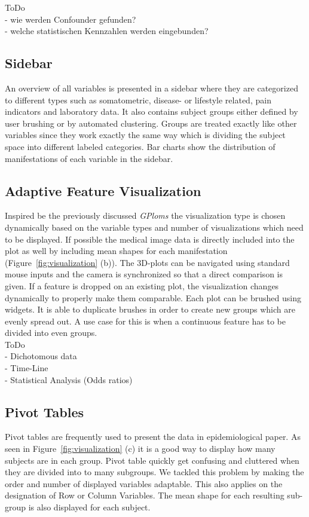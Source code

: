 \documentclass[journal]{style/vgtc} 			          %
\begin{document}
ToDo\\
- wie werden Confounder gefunden?\\
- welche statistischen Kennzahlen werden eingebunden?\\

\subsection{Sidebar}
An overview of all variables is presented in a sidebar where they are categorized to different types such as somatometric, disease- or lifestyle related, pain indicators and laboratory data.
%
It also contains subject groups either defined by user brushing or by automated clustering.
%
Groups are treated exactly like other variables since they work exactly the same way which is dividing the subject space into different labeled categories.
Bar charts show the distribution of manifestations of each variable in the sidebar.

\subsection{Adaptive Feature Visualization} \label{sec:AdaptiveFeatureVisualization}
Inspired be the previously discussed \emph{GPloms} \cite{Francois2013} the visualization type is chosen dynamically based on the variable types and number of visualizations which need to be displayed.
If possible the medical image data is directly included into the plot as well by including mean shapes for each manifestation (Figure~\ref{fig:visualization} (b)).
%
The 3D-plots can be navigated using standard mouse inputs and the camera is synchronized so that a direct comparison is given.
%
If a feature is dropped on an existing plot, the visualization changes dynamically to properly make them comparable. 
%
Each plot can be brushed using widgets.
%
It is able to duplicate brushes in order to create new groups which are evenly spread out.
%
A use case for this is when a continuous feature has to be divided into even groups.
\\
ToDo\\
- Dichotomous data\\
- Time-Line\\
- Statistical Analysis (Odds ratios)

\subsection{Pivot Tables}
Pivot tables are frequently used to present the data in epidemiological paper.
%
As seen in Figure~\ref{fig:visualization} (c) it is a good way to display how many subjects are in each group.
%
Pivot table quickly get confusing and cluttered when they are divided into to many subgroups.
%
We tackled this problem by making the order and number of displayed variables adaptable.
%
This also applies on the designation of Row or Column Variables.
The mean shape for each resulting sub-group is also displayed for each subject.
\end{document}
